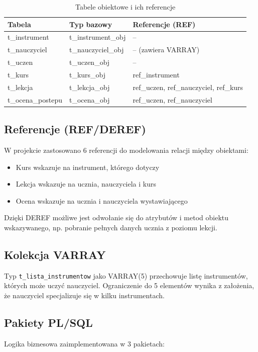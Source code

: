 \documentclass[12pt,a4paper]{article}
\begin{document}
\begin{table}[h]
\centering
\begin{tabular}{|l|l|l|}
\hline
\textbf{Tabela} & \textbf{Typ bazowy} & \textbf{Referencje (REF)} \\
\hline
t\_instrument & t\_instrument\_obj & -- \\
t\_nauczyciel & t\_nauczyciel\_obj & -- (zawiera VARRAY) \\
t\_uczen & t\_uczen\_obj & -- \\
t\_kurs & t\_kurs\_obj & ref\_instrument \\
t\_lekcja & t\_lekcja\_obj & ref\_uczen, ref\_nauczyciel, ref\_kurs \\
t\_ocena\_postepu & t\_ocena\_obj & ref\_uczen, ref\_nauczyciel \\
\hline
\end{tabular}
\caption{Tabele obiektowe i ich referencje}
\end{table}

\subsection{Referencje (REF/DEREF)}
W projekcie zastosowano 6 referencji do modelowania relacji między obiektami:
\begin{itemize}[nosep]
    \item Kurs wskazuje na instrument, którego dotyczy
    \item Lekcja wskazuje na ucznia, nauczyciela i kurs
    \item Ocena wskazuje na ucznia i nauczyciela wystawiającego
\end{itemize}

Dzięki DEREF możliwe jest odwołanie się do atrybutów i metod obiektu wskazywanego, np. pobranie pełnych danych ucznia z poziomu lekcji.

\subsection{Kolekcja VARRAY}
Typ \texttt{t\_lista\_instrumentow} jako VARRAY(5) przechowuje listę instrumentów, których może uczyć nauczyciel. Ograniczenie do 5 elementów wynika z założenia, że nauczyciel specjalizuje się w kilku instrumentach.

\subsection{Pakiety PL/SQL}
Logika biznesowa zaimplementowana w 3 pakietach:
\end{document}
